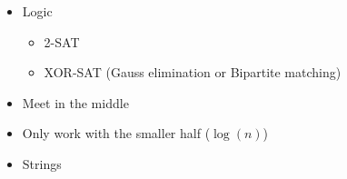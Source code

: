 \documentclass[9pt,a4paper,landscape,oneside]{amsart}
\newenvironment{myitemize}
{\begin{itemize}[leftmargin=.3cm]
	\setlength{\itemsep}{0pt}
	\setlength{\parskip}{0pt}
	\setlength{\parsep}{0pt}     }
{ \end{itemize}                  }
\begin{document}
\begin{multicols*}{3}
\begin{myitemize}
\begin{myitemize}
			\item Look for a pattern
			\item Permutations
				\begin{myitemize}
					\item Consider the cycles of the permutation
				\end{myitemize}
			\item Functions
				\begin{myitemize}
					\item Sum of piecewise-linear functions is a piecewise-linear function
					\item Sum of convex (concave) functions is convex (concave)
				\end{myitemize}
			\item Modular arithmetic
				\begin{myitemize}
					\item Chinese Remainder Theorem
					\item Linear Congruence
				\end{myitemize}
			\item Sieve
			\item System of linear equations
			\item Values too big to represent?
				\begin{myitemize}
					\item Compute using the logarithm
					\item Divide everything by some large value
				\end{myitemize}
			\item Linear programming
				\begin{myitemize}
					\item Is the dual problem easier to solve?
				\end{myitemize}
			\item Can the problem be modeled as a different combinatorial problem? Does that simplify calculations?
		\end{myitemize}
	\item Logic
		\begin{myitemize}
			\item 2-SAT
			\item XOR-SAT (Gauss elimination or Bipartite matching)
		\end{myitemize}
	\item Meet in the middle
	\item Only work with the smaller half ($\log(n)$)
	\item Strings
		\begin{myitemize}

\end{myitemize}
\end{myitemize}
\end{multicols*}
\end{document}
